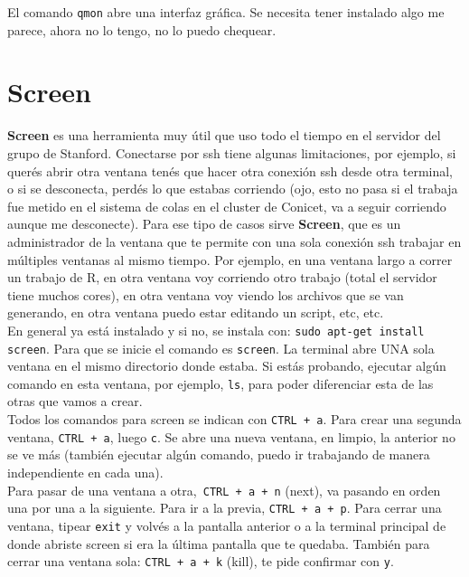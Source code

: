 \documentclass[paper=a4, fontsize=11pt]{article} %
\numberwithin{equation}{section} %
\numberwithin{figure}{section} %
\numberwithin{table}{section} %
\begin{document}
El comando \texttt{qmon} abre una interfaz gráfica. Se necesita tener instalado algo me parece, ahora no lo tengo, no lo puedo chequear.

\section{Screen}

\textbf{Screen} es una herramienta muy útil que uso todo el tiempo en el servidor del grupo de Stanford. Conectarse por ssh tiene algunas limitaciones, por ejemplo, si querés abrir otra ventana tenés que hacer otra conexión ssh desde otra terminal, o si se desconecta, perdés lo que estabas corriendo (ojo, esto no pasa si el trabaja fue metido en el sistema de colas en el cluster de Conicet, va a seguir corriendo aunque me desconecte). Para ese tipo de casos sirve \textbf{Screen}, que es un administrador de la ventana que te permite con una sola conexión ssh trabajar en múltiples ventanas al mismo tiempo. Por ejemplo, en una ventana largo a correr un trabajo de R, en otra ventana voy corriendo otro trabajo (total el servidor tiene muchos cores), en otra ventana voy viendo los archivos que se van generando, en otra ventana puedo estar editando un script, etc, etc. \\

En general ya está instalado y si no, se instala con: \texttt{sudo apt-get install screen}. Para que se inicie el comando es \texttt{screen}. La terminal abre UNA sola ventana en el mismo directorio donde estaba. Si estás probando, ejecutar algún comando en esta ventana, por ejemplo, \texttt{ls}, para poder diferenciar esta de las otras que vamos a crear. \\

Todos los comandos para screen se indican con \texttt{CTRL + a}. Para crear una segunda ventana, \texttt{CTRL + a}, luego \texttt{c}. Se abre una nueva ventana, en limpio, la anterior no se ve más (también ejecutar algún comando, puedo ir trabajando de manera independiente en cada una). \\

Para pasar de una ventana a otra,\texttt{ CTRL + a + n} (next), va pasando en orden una por una a la siguiente. Para ir a la previa, \texttt{CTRL + a + p}. Para cerrar una ventana, tipear \texttt{exit} y volvés a la pantalla anterior o a la terminal principal de donde abriste screen si era la última pantalla que te quedaba.  También para cerrar una ventana sola: \texttt{CTRL + a + k} (kill), te pide confirmar con \texttt{y}.\\
\end{document}
